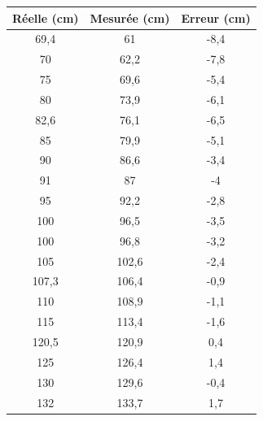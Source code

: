 \documentclass[11pt,a4paper]{article}
\begin{document}
\begin{figure}[H]
  \centering

  \resizebox{0.5\linewidth}{!}{\FtFhorizontale}

  \vspace{1em}

  \small
  \setlength{\tabcolsep}{4pt}
  \begin{minipage}[t]{0.48\textwidth}
    \vspace{0pt}
    \centering
    \begin{tabular}{|c|c|c|}
      \hline
      Réelle (cm) & Mesurée (cm) & Erreur (cm) \\ \hline
      69,4  & 61    & -8,4 \\ \hline
      70    & 62,2  & -7,8 \\ \hline
      75    & 69,6  & -5,4 \\ \hline
      80    & 73,9  & -6,1 \\ \hline
      82,6  & 76,1  & -6,5 \\ \hline
      85    & 79,9  & -5,1 \\ \hline
      90    & 86,6  & -3,4 \\ \hline
      91    & 87    & -4   \\ \hline
      95    & 92,2  & -2,8 \\ \hline
      100   & 96,5  & -3,5 \\ \hline
      100   & 96,8  & -3,2 \\ \hline
      105   & 102,6 & -2,4 \\ \hline
      107,3 & 106,4 & -0,9 \\ \hline
      110   & 108,9 & -1,1 \\ \hline
      115   & 113,4 & -1,6 \\ \hline
      120,5 & 120,9 & 0,4  \\ \hline
      125   & 126,4 & 1,4  \\ \hline
      130   & 129,6 & -0,4 \\ \hline
      132   & 133,7 & 1,7  \\ \hline
    \end{tabular}
  \end{minipage}\hfill
  \begin{minipage}[t]{0.48\textwidth}
    \vspace{0pt}
    \centering
    \begin{tabular}{|c|c|c|}
      \hline

\end{tabular}
\end{minipage}
\end{figure}
\end{document}
